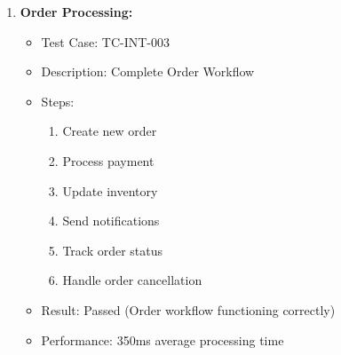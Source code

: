 \begin{enumerate}
    \item \textbf{Order Processing:}
    \begin{itemize}
        \item Test Case: TC-INT-003
        \item Description: Complete Order Workflow
        \item Steps:
        \begin{enumerate}
            \item Create new order
            \item Process payment
            \item Update inventory
            \item Send notifications
            \item Track order status
            \item Handle order cancellation
        \end{enumerate}
        \item Result: Passed (Order workflow functioning correctly)
        \item Performance: 350ms average processing time
    \end{itemize}
\end{enumerate}

